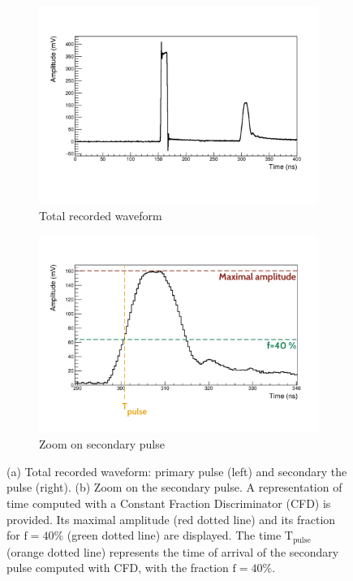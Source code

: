 \begin{figure}[h]
  \centering
  \begin{subfigure}[t]{0.7\textwidth}
    \centering
    \includegraphics[trim={1.2cm 3.5cm 1.7cm 3.1cm},clip,width=1\textwidth]{commissioning/fig_commissioning/CFD_example.pdf}
    \captionsetup{justification=centering}
    \caption{Total recorded waveform
      \label{subfig:total_waveform}}
  \end{subfigure}
  \hfill
  \begin{subfigure}[t]{0.7\textwidth}
    \centering
    \includegraphics[trim={1.2cm 1.5cm 1.7cm 3.1cm},clip,width=1\textwidth]{commissioning/fig_commissioning/CFD_example_zoom.pdf}
    \captionsetup{justification=centering}
    \caption{Zoom on secondary pulse
      \label{subfig:zoom_secondary}}
  \end{subfigure}
  \caption{(a) Total recorded waveform: primary pulse (left) and secondary the pulse (right).
    (b) Zoom on the secondary pulse.
    A representation of time computed with a Constant Fraction Discriminator (CFD) is provided.
    Its maximal amplitude (red dotted line) and its fraction for $\text{f}=40\%$ (green dotted line) are displayed.
    The time $\text{T}_{\text{pulse}}$ (orange dotted line) represents the time of arrival of the secondary pulse computed with CFD, with the fraction $\text{f}=40\%$.
    \label{fig:CFD}}
\end{figure}
